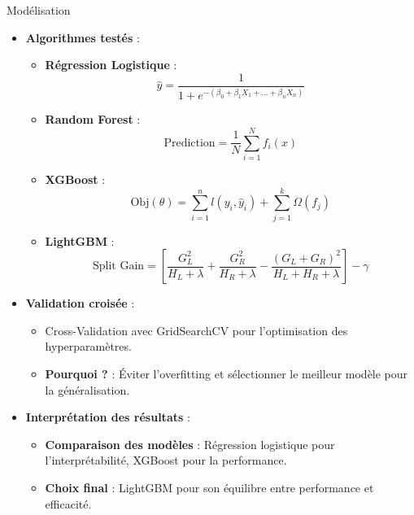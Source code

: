 \documentclass{beamer}
\begin{document}
\begin{frame}{Modélisation}
    \begin{itemize}
        \item \textbf{Algorithmes testés} :
            \begin{itemize}
                \item \textbf{Régression Logistique} :
                \[
                \hat{y} = \frac{1}{1 + e^{-(\beta_0 + \beta_1 X_1 + \dots + \beta_n X_n)}}
                \]
                \item \textbf{Random Forest} :
                \[
                \text{Prediction} = \frac{1}{N} \sum_{i=1}^{N} f_i(x)
                \]
                \item \textbf{XGBoost} :
                \[
                \text{Obj}(\theta) = \sum_{i=1}^{n} l(y_i, \hat{y}_i) + \sum_{j=1}^{k} \Omega(f_j)
                \]
                \item \textbf{LightGBM} :
                \[
                \text{Split Gain} = \left[\frac{G_L^2}{H_L + \lambda} + \frac{G_R^2}{H_R + \lambda} - \frac{(G_L + G_R)^2}{H_L + H_R + \lambda}\right] - \gamma
                \]
            \end{itemize}
        \item \textbf{Validation croisée} :
            \begin{itemize}
                \item Cross-Validation avec GridSearchCV pour l'optimisation des hyperparamètres.
                \item \textbf{Pourquoi ?} : Éviter l'overfitting et sélectionner le meilleur modèle pour la généralisation.
            \end{itemize}
        \item \textbf{Interprétation des résultats} :
            \begin{itemize}
                \item \textbf{Comparaison des modèles} : Régression logistique pour l'interprétabilité, XGBoost pour la performance.
                \item \textbf{Choix final} : LightGBM pour son équilibre entre performance et efficacité.
            \end{itemize}
    \end{itemize}

\end{frame}
\end{document}

